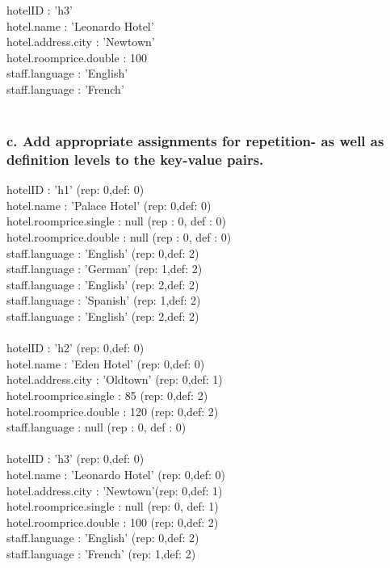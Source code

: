 \documentclass{article}
\begin{document}
hotelID : ’h3’\\
hotel.name : ’Leonardo Hotel’\\
hotel.address.city : ’Newtown’\\
hotel.roomprice.double : 100\\
staff.language : ’English’\\
staff.language : ’French’\\\\

\subsubsection{c. Add appropriate assignments for repetition- as well as definition levels to the key-value pairs.}

hotelID : ’h1’ (rep: 0,def: 0)\\
hotel.name : ’Palace Hotel’ (rep: 0,def: 0)\\
hotel.roomprice.single : null (rep : 0, def : 0)\\
hotel.roomprice.double : null (rep : 0, def : 0)\\
staff.language : ’English’ (rep: 0,def: 2)\\
staff.language : ’German’ (rep: 1,def: 2)\\
staff.language : ’English’ (rep: 2,def: 2)\\
staff.language : ’Spanish’ (rep: 1,def: 2)\\
staff.language : ’English’ (rep: 2,def: 2)\\\\

hotelID : ’h2’ (rep: 0,def: 0)\\
hotel.name : ’Eden Hotel’ (rep: 0,def: 0)\\
hotel.address.city : ’Oldtown’ (rep: 0,def: 1)\\
hotel.roomprice.single : 85 (rep: 0,def: 2)\\
hotel.roomprice.double : 120 (rep: 0,def: 2)\\
staff.language : null (rep : 0, def : 0)\\\\

hotelID : ’h3’ (rep: 0,def: 0)\\
hotel.name : ’Leonardo Hotel’ (rep: 0,def: 0)\\
hotel.address.city : ’Newtown’(rep: 0,def: 1)\\
hotel.roomprice.single : null (rep: 0, def: 1)\\
hotel.roomprice.double : 100 (rep: 0,def: 2)\\
staff.language : ’English’ (rep: 0,def: 2)\\
staff.language : ’French’ (rep: 1,def: 2)\\\\
\end{document}
